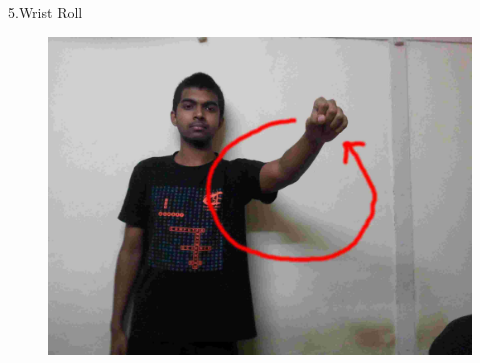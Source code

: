 \documentclass{beamer}
\begin{document}
\begin{frame}{5.Wrist Roll}
  \begin{figure}
      \centering
      \includegraphics[scale = .08]{gestures/5.jpg} 
  \end{figure}
\end{frame}
\end{document}
